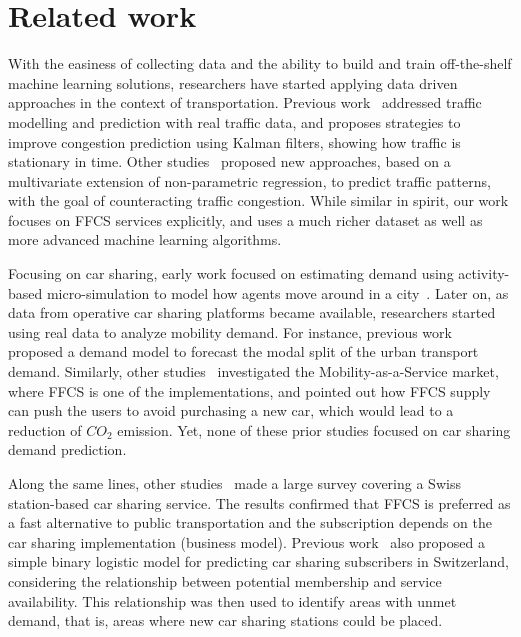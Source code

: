 \section{Related work}
\label{sec:8_2_related_works}

With the easiness of collecting data and the ability to build and train off-the-shelf machine learning solutions, researchers have started applying data driven approaches in the context of transportation.
Previous work~\citep{2_okutani1984dynamic} addressed traffic modelling and prediction with real traffic data, and proposes strategies to improve congestion prediction using Kalman filters, showing how traffic is stationary in time.  
Other studies~\citep{3_clark2003traffic} proposed new approaches, based on a multivariate extension of non-parametric regression, to predict traffic patterns, with the goal of counteracting traffic congestion. 
While similar in spirit, our work focuses on FFCS services explicitly, and uses a much richer dataset as well as more advanced machine learning algorithms.

Focusing on car sharing, early work focused on estimating demand using activity-based micro-simulation to model how agents move around in a city~\citep{Ciari2013}. 
Later on, as data from operative car sharing platforms became available, researchers started using real data to analyze mobility demand. For instance, previous work~\citep{catalano2008car,Firnkorn2011} proposed a demand model to forecast the modal split of the urban transport demand. Similarly, other studies~\citep{Firnkorn2012} investigated the Mobility-as-a-Service market, where FFCS is one of the implementations, and pointed out how FFCS supply can push the users to avoid purchasing a new car, which would lead to a reduction of $CO_{2}$ emission. Yet, none of these prior studies focused on car sharing demand prediction. 

Along the same lines, other studies~\citep{becker:17} made a large survey covering a Swiss station-based car sharing service. The results confirmed that FFCS is preferred as a fast alternative to public transportation and the subscription depends on the car sharing implementation (business model). 
Previous work~\citep{17_ciari2016evaluating} also proposed a simple binary logistic model for predicting car sharing subscribers in Switzerland, considering the relationship between potential membership and service availability. This relationship was then used to identify areas with unmet demand, that is, areas where new car sharing stations could be placed. 

